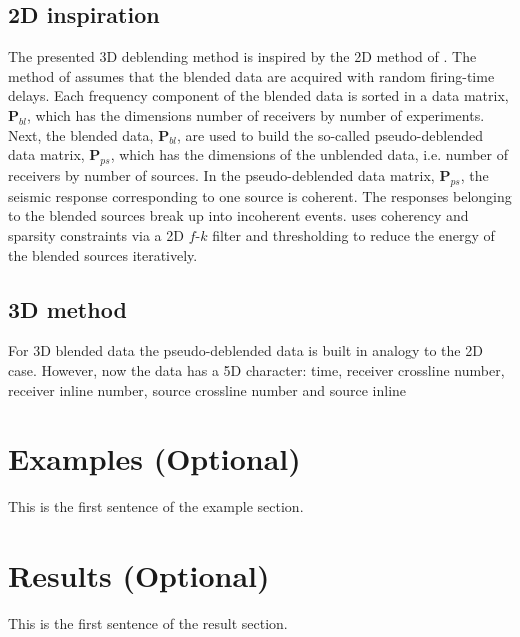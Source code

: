 \documentclass{madrid15WS}
\begin{document}
\subsection{2D inspiration}

The presented 3D deblending method is inspired by the 2D method of \citet{Mahdad-Deblending-Method}. The method of \citet{Mahdad-Deblending-Method} assumes that the blended data are acquired with random firing-time delays. Each frequency component of the blended data is sorted in a data matrix, $\mathbf{P}_{bl}$, which has the dimensions number of receivers by number of experiments. Next, the blended data, $\mathbf{P}_{bl}$, are used to build the so-called pseudo-deblended data matrix, $\mathbf{P}_{ps}$, which has the dimensions of the unblended data, i.e. number of receivers by number of sources. In the pseudo-deblended data matrix, $\mathbf{P}_{ps}$, the seismic response corresponding to one source is coherent. The responses belonging to the blended sources break up into incoherent events. \citet{Mahdad-Deblending-Method} uses coherency and sparsity constraints via a 2D $f$-$k$ filter and thresholding to reduce the energy of the blended sources iteratively. 

\subsection{3D method}  

For 3D blended data the pseudo-deblended data is built in analogy to the 2D case. However, now the data has a 5D character: time, receiver crossline number, receiver inline number, source crossline number and source inline  



\section{Examples (Optional)}

This is the first sentence of the example section.

\section{Results (Optional)}

This is the first sentence of the result section.

\end{document}
